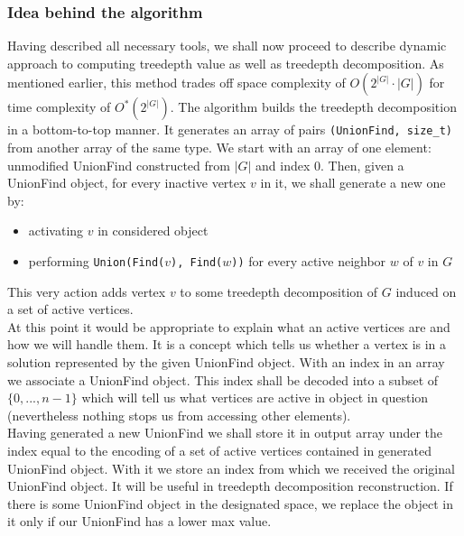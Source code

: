 \subsubsection{Idea behind the algorithm}
Having described all necessary tools, we shall now proceed to describe dynamic approach to computing treedepth value as well as treedepth decomposition. As mentioned earlier, this method trades off space complexity of $O\left(2^{\left|G\right|}\cdot\left|G\right|\right)$ for time complexity of  $O^{*}\left(2^{\left|G\right|}\right)$.
The algorithm builds the treedepth decomposition in a bottom-to-top manner. It generates an array of pairs \texttt{(UnionFind, size\_t)} from another array of the same type. We start with an array of one element: unmodified UnionFind constructed from $\left|G\right|$ and index 0. Then, given a UnionFind object, for every inactive vertex $v$ in it, we shall generate a new one by:
\begin{itemize}
	\item activating $v$ in considered object
	\item performing \texttt{Union(Find($v$), Find($w$))} for every active neighbor $w$ of $v$ in $G$
\end{itemize}
This very action adds vertex $v$ to some treedepth decomposition of $G$ induced on a set of active vertices.\\
At this point it would be appropriate to explain what an active vertices are and how we will handle them. It is a concept which tells us whether a vertex is in a solution represented by the given UnionFind object. With an index in an array we associate a UnionFind object. This index shall be decoded into a subset of $\{0,...,n-1\}$ which will tell us what vertices are active in object in question (nevertheless nothing stops us from accessing other elements).\\
Having generated a new UnionFind we shall store it in output array under the index equal to the encoding of a set of active vertices contained in generated UnionFind object. With it we store an index from which we received the original UnionFind object. It will be useful in treedepth decomposition reconstruction. If there is some UnionFind object in the designated space, we replace the object in it only if our UnionFind has a lower max value.
